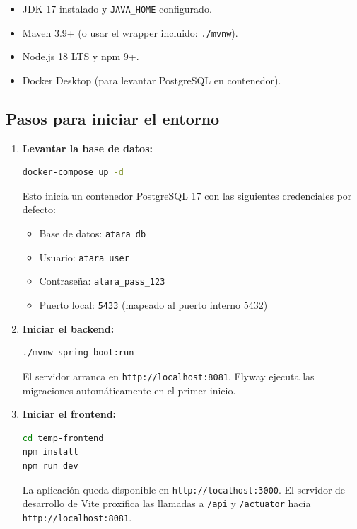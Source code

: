\documentclass[11pt, a4paper]{article}
\begin{document}
\begin{itemize}
  \item JDK 17 instalado y \texttt{JAVA\_HOME} configurado.
  \item Maven 3.9+ (o usar el wrapper incluido: \texttt{./mvnw}).
  \item Node.js 18 LTS y npm 9+.
  \item Docker Desktop (para levantar PostgreSQL en contenedor).
\end{itemize}

\subsection{Pasos para iniciar el entorno}

\begin{enumerate}
  \item \textbf{Levantar la base de datos:}
\begin{lstlisting}[language=bash]
docker-compose up -d
\end{lstlisting}
  Esto inicia un contenedor PostgreSQL 17 con las siguientes credenciales por defecto:
  \begin{itemize}
    \item Base de datos: \texttt{atara\_db}
    \item Usuario: \texttt{atara\_user}
    \item Contraseña: \texttt{atara\_pass\_123}
    \item Puerto local: \texttt{5433} (mapeado al puerto interno 5432)
  \end{itemize}

  \item \textbf{Iniciar el backend:}
\begin{lstlisting}[language=bash]
./mvnw spring-boot:run
\end{lstlisting}
  El servidor arranca en \texttt{http://localhost:8081}. Flyway ejecuta las migraciones automáticamente en el primer inicio.

  \item \textbf{Iniciar el frontend:}
\begin{lstlisting}[language=bash]
cd temp-frontend
npm install
npm run dev
\end{lstlisting}
  La aplicación queda disponible en \texttt{http://localhost:3000}. El servidor de desarrollo de Vite proxifica las llamadas a \texttt{/api} y \texttt{/actuator} hacia \texttt{http://localhost:8081}.
\end{enumerate}
\end{document}
